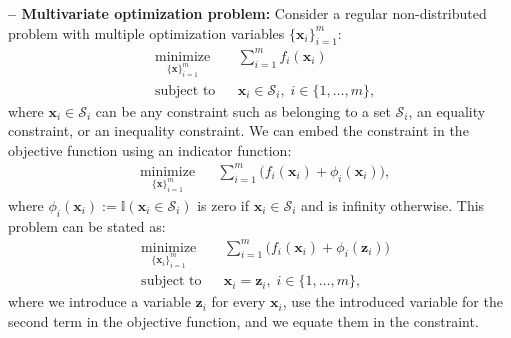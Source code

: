 \documentclass[lang=cn,10pt]{gorgeousnbook}
\numberwithin{equation}{section}%
\numberwithin{figure}{section}%
\begin{document}
\hfill\break
\textbf{-- Multivariate optimization problem:}
Consider a regular non-distributed problem with multiple optimization variables $\{\boldsymbol{x}_i\}_{i=1}^m$:
\begin{equation}\label{equation_ADMM_optimization_problem_general_notDistributed2}
\begin{aligned}
& \underset{\{\boldsymbol{x}\}_{i=1}^m}{\text{minimize}}
& & \sum_{i=1}^m f_i(\boldsymbol{x}_i) \\
& \text{subject to}
& & \boldsymbol{x}_i \in \mathcal{S}_i, \; i \in \{1, \ldots, m\},
\end{aligned}
\end{equation}
where $\boldsymbol{x}_i \in \mathcal{S}_i$ can be any constraint such as belonging to a set $\mathcal{S}_i$, an equality constraint, or an inequality constraint. 
We can embed the constraint in the objective function using an indicator function:
\begin{equation*}
\begin{aligned}
& \underset{\{\boldsymbol{x}\}_{i=1}^m}{\text{minimize}}
& & \sum_{i=1}^m \big(f_i(\boldsymbol{x}_i) + \phi_i(\boldsymbol{x}_i)\big),
\end{aligned}
\end{equation*}
where $\phi_i(\boldsymbol{x}_i) := \mathbb{I}(\boldsymbol{x}_i \in \mathcal{S}_i)$ is zero if $\boldsymbol{x}_i \in \mathcal{S}_i$ and is infinity otherwise. 
This problem can be stated as:
\begin{equation}\label{equation_ADMM_optimization_problem_general_Distributed2}
\begin{aligned}
& \underset{\{\boldsymbol{x}_i\}_{i=1}^m}{\text{minimize}}
& & \sum_{i=1}^m \big(f_i(\boldsymbol{x}_i) + \phi_i(\boldsymbol{z}_i)\big) \\
& \text{subject to}
& & \boldsymbol{x}_i = \boldsymbol{z}_i, \; i \in \{1, \ldots, m\},
\end{aligned}
\end{equation}
where we introduce a variable $\boldsymbol{z}_i$ for every $\boldsymbol{x}_i$, use the introduced variable for the second term in the objective function, and we equate them in the constraint. 
\end{document}
